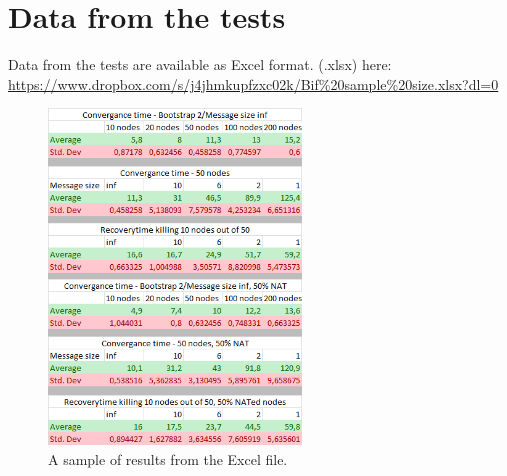 \documentclass[10pt]{proc}
\begin{document}
\section {Data from the tests}
Data from the tests are available as Excel format. (.xlsx) here:
\url{https://www.dropbox.com/s/j4jhmkupfzxc02k/Bif%20sample%20size.xlsx?dl=0}
\begin{figure}[h!]
\centering
\includegraphics[width=0.6\textwidth]{tests.png}
\caption{\label{fig.8}A sample of results from the Excel file.}
\end{figure}
\end{document}
